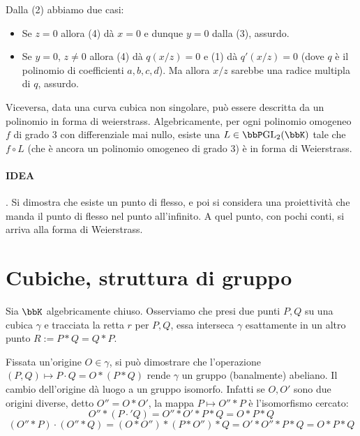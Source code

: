 Dalla (2) abbiamo due casi:

\begin{itemize}
	\item Se $z=0$ allora (4) dà $x=0$ e dunque $y=0$ dalla (3), assurdo.

	\item Se $y = 0$, $z \neq 0$ allora (4) dà $q(x/z) = 0$ e (1) dà $q'(x/z) = 0$ (dove $q$ è il polinomio di coefficienti $a,b,c,d$). Ma allora $x/z$ sarebbe una radice multipla di $q$, assurdo.
\end{itemize}

Viceversa, data una curva cubica non singolare, può essere descritta da un polinomio in forma di weierstrass. Algebricamente, per ogni polinomio omogeneo $f$ di grado 3 con differenziale mai nullo, esiste una $L \in \bbP \GL_2(\bbK) $ tale che $f \circ L$ (che è ancora un polinomio omogeneo di grado 3) è in forma di Weierstrass.
\paragraph{IDEA}. Si dimostra che esiste un punto di flesso, e poi si considera una proiettività che manda il punto di flesso nel punto all'infinito. A quel punto, con pochi conti, si arriva alla forma di Weierstrass.

\section{Cubiche, struttura di gruppo}

Sia $\bbK$ algebricamente chiuso. Osserviamo che presi due punti $P,Q$ su una cubica $\gamma$ e tracciata la retta $r$ per $P,Q$, essa interseca $\gamma$ esattamente in un altro punto $R:=P * Q = Q*P$. 

Fissata un'origine $O \in \gamma$, si può dimostrare che l'operazione $(P,Q) \mapsto P \cdot Q = O*(P*Q)$ rende $\gamma$ un gruppo (banalmente) abeliano. Il cambio dell'origine dà luogo a un gruppo isomorfo. Infatti se $O,O'$ sono due origini diverse, detto $O'' = O*O'$, la mappa $P \mapsto O'' * P$ è l'isomorfismo cercato:
$$ O'' * (P \cdot' Q) = O'' * O'*P*Q = O*P*Q $$
$$ (O''*P) \cdot (O''*Q) = (O*O'')*(P*O'')*Q = O'*O''*P*Q=O*P*Q$$

